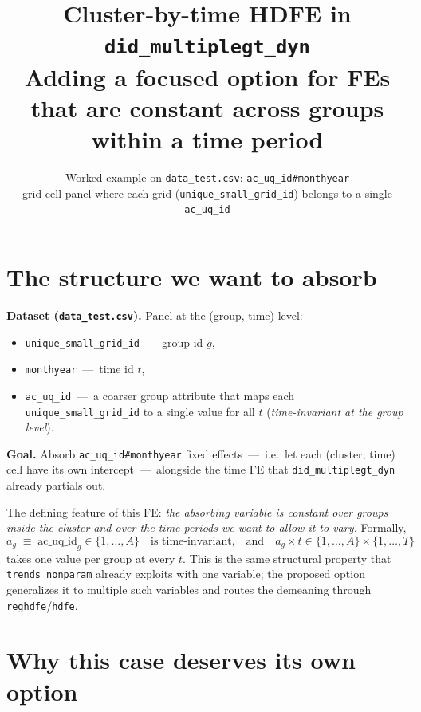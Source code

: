 \documentclass[11pt]{article}
\title{\textbf{Cluster-by-time HDFE in \texttt{did\_multiplegt\_dyn}} \\[2pt]
       \large Adding a focused option for FEs that are constant across groups within a time period}
\author{Worked example on \texttt{data\_test.csv}: \texttt{ac\_uq\_id\#monthyear}\\
        \small grid-cell panel where each grid (\texttt{unique\_small\_grid\_id}) belongs to a single \texttt{ac\_uq\_id}}
\date{}
\newcommand{\code}[1]{\texttt{\small #1}}
\newcommand{\1}{\mathbb{1}}
\begin{document}
\maketitle

\section{The structure we want to absorb}

\begin{tcolorbox}[colback=codebg, colframe=navy, boxrule=0.6pt, arc=1pt]
\textbf{Dataset (\code{data\_test.csv}).}
Panel at the (group, time) level:
\begin{itemize}[leftmargin=*, itemsep=0pt]
\item \code{unique\_small\_grid\_id} \,---\, group id $g$,
\item \code{monthyear} \,---\, time id $t$,
\item \code{ac\_uq\_id} \,---\, a coarser group attribute that maps each
      \code{unique\_small\_grid\_id} to a single value for all $t$
      (\emph{time-invariant at the group level}).
\end{itemize}
\textbf{Goal.} Absorb \code{ac\_uq\_id\#monthyear} fixed effects \,---\, i.e.\
let each (cluster, time) cell have its own intercept \,---\, alongside the
time FE that \texttt{did\_multiplegt\_dyn} already partials out.
\end{tcolorbox}

\noindent
The defining feature of this FE: \emph{the absorbing variable is constant
over groups inside the cluster and over the time periods we want to allow it
to vary.} Formally,
\begin{equation}
a_g \;\equiv\; \mathrm{ac\_uq\_id}_g \in \{1,\dots,A\}\quad\text{is time-invariant,}\quad\text{and}\quad
a_g\times t \in \{1,\dots,A\}\times\{1,\dots,T\}
\label{eq:struct}
\end{equation}
takes one value per group at every $t$. This is the same structural
property that \texttt{trends\_nonparam} already exploits with one variable;
the proposed option generalizes it to multiple such variables and routes the
demeaning through \texttt{reghdfe}/\texttt{hdfe}.

\section{Why this case deserves its own option}
\end{document}
